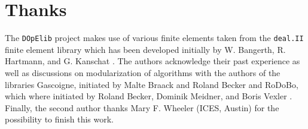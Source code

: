 \documentclass[smallextended]{svjour3}       %
\numberwithin{equation}{section}
\newcommand{\deal}{\texttt{deal.II}}
\newcommand{\dope}{\texttt{DOpElib}}
\begin{document}
\section*{Thanks}
The \dope{} project makes use of various finite elements taken from  
the \deal{} \cite{dealnew} finite element library which has been developed
 initially by W. Bangerth, R. Hartmann, and G. Kanschat \cite{dealold}.
The authors acknowledge their past experience as well as discussions 
on modularization of algorithms
with 
the authors of the libraries 
Gascoigne, initiated by Malte Braack and  Roland Becker \cite{gascoigne}
and RoDoBo, which where initiated by 
Roland Becker, Dominik Meidner, and Boris Vexler \cite{rodobo}. 
Finally, the second author thanks Mary F. Wheeler (ICES, Austin) for the 
possibility to finish this work.

%


%
\end{document}
